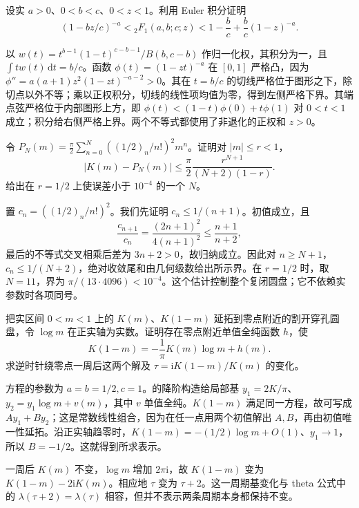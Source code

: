 \begin{exercise}\label{b3:ex:F-2}
设实 \(a>0\)、\(0<b<c\)、\(0<z<1\)。利用 Euler 积分证明
\[
 (1-bz/c)^{-a}<{}_2F_1(a,b;c;z)
   <1-\frac bc+\frac bc(1-z)^{-a}.
\]
\end{exercise}
\begin{solution}
以 \(w(t)=t^{b-1}(1-t)^{c-b-1}/B(b,c-b)\) 作归一化权，其积分为一，且 \(\int tw(t)\,\mathrm{d}t=b/c\)。函数 \(\phi(t)=(1-zt)^{-a}\) 在 \([0,1]\) 严格凸，因为
\(\phi''=a(a+1)z^2(1-zt)^{-a-2}>0\)。其在 \(t=b/c\) 的切线严格位于图形之下，除切点以外不等；乘以正权积分，切线的线性项均值为零，得到左侧严格下界。其端点弦严格位于内部图形上方，即
\(\phi(t)<(1-t)\phi(0)+t\phi(1)\) 对 \(0<t<1\) 成立；积分给右侧严格上界。两个不等式都使用了非退化的正权和 \(z>0\)。
\end{solution}

\begin{exercise}\label{b3:ex:F-3}
令 \(P_N(m)=\frac\pi2\sum_{n=0}^N((1/2)_n/n!)^2m^n\)。证明对 \(|m|\le r<1\)，
\[
 |K(m)-P_N(m)|\le\frac\pi2\frac{r^{N+1}}{(N+2)(1-r)}.
\]
给出在 \(r=1/2\) 上使误差小于 \(10^{-4}\) 的一个 \(N\)。
\end{exercise}
\begin{solution}
置 \(c_n=((1/2)_n/n!)^2\)。我们先证明 \(c_n\le1/(n+1)\)。初值成立，且
\[
 \frac{c_{n+1}}{c_n}=\frac{(2n+1)^2}{4(n+1)^2}
 \le\frac{n+1}{n+2},
\]
最后的不等式交叉相乘后差为 \(3n+2>0\)，故归纳成立。因此对 \(n\ge N+1\)，\(c_n\le1/(N+2)\)，绝对收敛尾和由几何级数给出所示界。在 \(r=1/2\) 时，取 \(N=11\)，界为 \(\pi/(13\cdot4096)<10^{-4}\)。这个估计控制整个复闭圆盘；它不依赖实参数时各项同号。
\end{solution}

\begin{exercise}\label{b3:ex:F-4}
把实区间 \(0<m<1\) 上的 \(K(m)\)、\(K(1-m)\) 延拓到零点附近的割开穿孔圆盘，令 \(\log m\) 在正实轴为实数。证明存在零点附近单值全纯函数 \(h\)，使
\[
 K(1-m)=-\frac1\pi K(m)\log m+h(m).
\]
求逆时针绕零点一周后这两个解及 \(\tau=\mathrm{i}K(1-m)/K(m)\) 的变化。
\end{exercise}
\begin{solution}
方程的参数为 \(a=b=1/2,c=1\)。的降阶构造给局部基 \(y_1=2K/\pi\)、\(y_2=y_1\log m+v(m)\)，其中 \(v\) 单值全纯。\(K(1-m)\) 满足同一方程，故可写成 \(A y_1+B y_2\)；这是常数线性组合，因为在任一点用两个初值解出 \(A,B\)，再由初值唯一性延拓。沿正实轴趋零时，\(K(1-m)=-(1/2)\log m+O(1)\)、\(y_1\to1\)，所以 \(B=-1/2\)。这就得到所求表示。

一周后 \(K(m)\) 不变，\(\log m\) 增加 \(2\pi\mathrm{i}\)，故 \(K(1-m)\) 变为 \(K(1-m)-2\mathrm{i}K(m)\)。相应地 \(\tau\) 变为 \(\tau+2\)。这一周期基变化与 theta 公式中的 \(\lambda(\tau+2)=\lambda(\tau)\) 相容，但并不表示两条周期本身都保持不变。
\end{solution}

